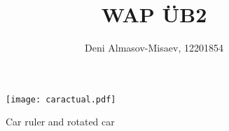 \documentclass[12pt]{article}
\title{WAP ÜB2}
\author{Deni Almasov-Misaev, 12201854}
\date{}
\begin{document}
\maketitle

\begin{figure}[h]
    \centering
    \texttt{[image: caractual.pdf]} %
    \caption{Car ruler and rotated car}
    \label{fig:car}
\end{figure}
\end{document}
